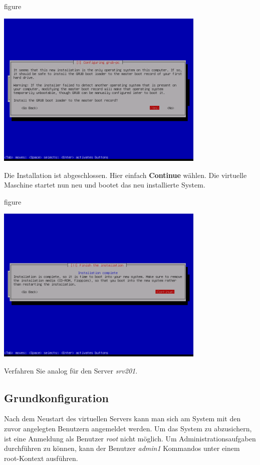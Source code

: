 \begin{nofloat}{figure}
\begin{center}
\includegraphics[width=0.75\textwidth]{screenshots/34_ubuntu_install.png}
\end{center}
\end{nofloat}
\newpage
Die Installation ist abgeschlossen. Hier einfach \textbf{Continue} wählen. Die
virtuelle Maschine startet nun neu und bootet das neu installierte System.

\begin{nofloat}{figure}
\begin{center}
\includegraphics[width=0.75\textwidth]{screenshots/35_ubuntu_install.png}
\end{center}
\end{nofloat}

Verfahren Sie analog für den Server \textit{srv201}.

\subsection{Grundkonfiguration}
Nach dem Neustart des virtuellen Servers kann man sich am System mit den zuvor
angelegten Benutzern angemeldet werden. Um das System zu abzusichern, ist eine
Anmeldung als Benutzer \textit{root} nicht möglich. Um Administrationsaufgaben
durchführen zu können, kann der Benutzer \textit{admin1} Kommandos unter einem
root-Kontext ausführen.

